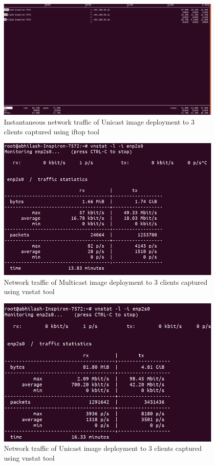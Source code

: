 \documentclass[a4paper,12pt]{article}
\begin{document}
\begin{figure}
  \centering
  \includegraphics[width=1\linewidth]{unicast_3_iftop.png}
  \caption{ Instantaneous network traffic of Unicast image deployment to 3 clients captured using iftop tool}
  \label{unicast_iftop}
\end{figure}

\begin{figure}
  \centering
  \includegraphics[width=1\linewidth]{multicast_3.png}
  \caption{Network traffic of Multicast image deployment to 3 clients captured using vnstat tool}
  \label{multicast_vnstat}
\end{figure}

\begin{figure}
  \centering
  \includegraphics[width=1\linewidth]{unicast_3_vmstat.png}
  \caption{Network traffic of Unicast image deployment to 3 clients captured using vnstat tool}
  \label{unicast_vnstat}
\end{figure}
\newpage
\end{document}
